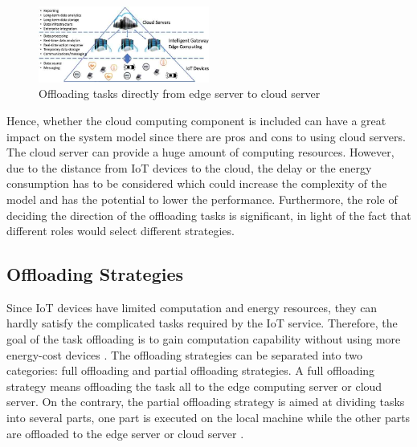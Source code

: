 \documentclass[a4paper,11pt]{article}
\begin{document}
\begin{figure}[h]
        \centering
        \includegraphics[width=0.5\textwidth]{edgeconnectedcloud.jpg}
        \caption{Offloading tasks directly from edge server to cloud server \cite{aim_offloading}}
\end{figure}
\newpage
Hence, whether the cloud computing component is included can have a great impact on the system model since there are pros and cons to using cloud servers. The cloud server can provide a huge amount of computing resources. However, due to the distance from IoT devices to the cloud, the delay or the energy consumption has to be considered which could increase the complexity of the model and has the potential to lower the performance. Furthermore, the role of deciding the direction of the offloading tasks is significant, in light of the fact that different roles would select different strategies. 



\subsection{Offloading Strategies}
Since IoT devices have limited computation and energy resources, they can hardly satisfy the complicated tasks required by the IoT service. Therefore, the goal of the task offloading is to gain computation capability without using more energy-cost devices \cite{aim_offloading}. The offloading strategies can be separated into two categories: full offloading and partial offloading strategies. A full offloading strategy means offloading the task all to the edge computing server or cloud server. On the contrary, the partial offloading strategy is aimed at dividing tasks into several parts, one part is executed on the local machine while the other parts are offloaded to the edge server or cloud server \cite{full_partial}. 
\end{document}
